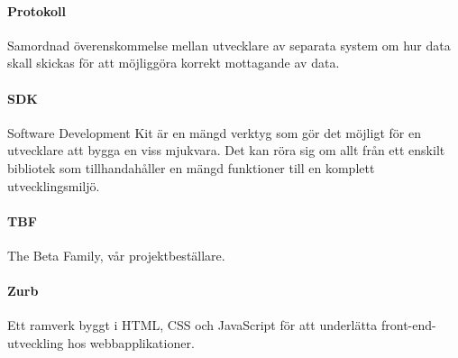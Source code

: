 \paragraph{Protokoll} Samordnad överenskommelse mellan utvecklare av separata system om hur data skall skickas för att möjliggöra korrekt mottagande av data.

\paragraph{SDK} Software Development Kit är en mängd verktyg som gör det möjligt för en utvecklare att bygga en viss mjukvara. Det kan röra sig om allt från ett enskilt bibliotek som tillhandahåller en mängd funktioner till en komplett utvecklingsmiljö.

\paragraph{TBF} The Beta Family, vår projektbeställare.

\paragraph{Zurb} Ett ramverk byggt i HTML, CSS och JavaScript för att underlätta front-end-utveckling hos webbapplikationer\parencite{zurb}.
